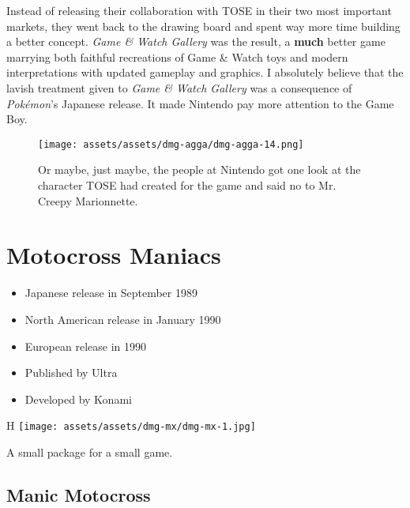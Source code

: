 \documentclass{book}
\begin{document}
Instead of releasing their collaboration with TOSE in their two most important markets, they went back to the drawing board and spent way more time building a better concept. \emph{Game \& Watch Gallery} was the result, a \textbf{much} better game marrying both faithful recreations of Game \& Watch toys and modern interpretations with updated gameplay and graphics. I absolutely believe that the lavish treatment given to \emph{Game \& Watch Gallery} was a consequence of \emph{Pokémon}’s Japanese release. It made Nintendo pay more attention to the Game Boy.

\begin{figure}[hbt]
\vskip 10pt
\centering \texttt{[image: assets/assets/dmg-agga/dmg-agga-14.png]}\par\pagetwodescription Or maybe, just maybe, the people at Nintendo got one look at the character TOSE had created for the game and said no to Mr. Creepy Marionnette.
\vskip 6pt
\end{figure}


\begingroup \chapter*{Motocross Maniacs} \endgroup

\begin{itemize} \setlength\itemsep{-0.4em}
\item Japanese release in September 1989
\item North American release in January 1990
\item European release in 1990
\item Published by Ultra
\item Developed by Konami
\end{itemize}\noindent

\begin{wrapfigure}{H}{\linewidth}
\vskip 4pt
\centering \texttt{[image: assets/assets/dmg-mx/dmg-mx-1.jpg]}\par\pagetwodescription A small package for a small game.\end{wrapfigure}
\clearpage

\FloatBarrier\needspace{5pt}\section*{Manic Motocross}\nopagebreak[4]
\end{document}
